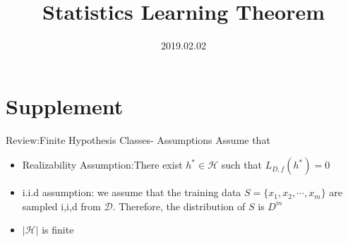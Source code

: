 \documentclass{beamer}
\title[Introduction]{Statistics Learning Theorem}
\author{}
\institute{}
\date{2019.02.02}
\begin{document}
\begin{frame}
  \titlepage
\end{frame}


\section{Supplement}

\begin{frame}{Review:Finite Hypothesis Classes- Assumptions}
Assume that 
\begin{itemize}
	\item Realizability Assumption:There exist $h^* \in \mathcal{H}$ such that $L_{D,f}(h^*)=0$
	\item i.i.d assumption: we assume that the training data $S = \{x_1,x_2, \cdots,x_m\}$ are sampled i,i,d from $\mathcal{D}$. Therefore, the distribution of $S$ is $D^m$
	\item $ |\mathcal{H}|$ is finite
\end{itemize}

\end{frame}
\end{document}
